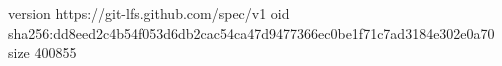 version https://git-lfs.github.com/spec/v1
oid sha256:dd8eed2c4b54f053d6db2cac54ca47d9477366ec0be1f71c7ad3184e302e0a70
size 400855

